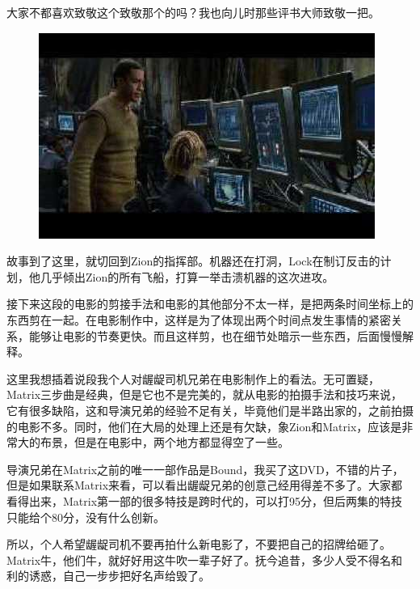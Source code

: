 \documentclass[UTF8]{ctexart}
\begin{document}
大家不都喜欢致敬这个致敬那个的吗？我也向儿时那些评书大师致敬一把。

\begin{figure}[htb]
\centering
\includegraphics[width=0.5\linewidth]{fig/read_reloaded-143}
\end{figure}

故事到了这里，就切回到Zion的指挥部。机器还在打洞，Lock在制订反击的计划，他几乎倾出Zion的所有飞船，打算一举击溃机器的这次进攻。

接下来这段的电影的剪接手法和电影的其他部分不太一样，是把两条时间坐标上的东西剪在一起。在电影制作中，这样是为了体现出两个时间点发生事情的紧密关系，能够让电影的节奏更快。而且这样剪，也在细节处暗示一些东西，后面慢慢解释。

这里我想插着说段我个人对龌龊司机兄弟在电影制作上的看法。无可置疑，Matrix三步曲是经典，但是它也不是完美的，就从电影的拍摄手法和技巧来说，它有很多缺陷，这和导演兄弟的经验不足有关，毕竟他们是半路出家的，之前拍摄的电影不多。同时，他们在大局的处理上还是有欠缺，象Zion和Matrix，应该是非常大的布景，但是在电影中，两个地方都显得空了一些。

导演兄弟在Matrix之前的唯一一部作品是Bound，我买了这DVD，不错的片子，但是如果联系Matrix来看，可以看出龌龊兄弟的创意己经用得差不多了。大家都看得出来，Matrix第一部的很多特技是跨时代的，可以打95分，但后两集的特技只能给个80分，没有什么创新。

所以，个人希望龌龊司机不要再拍什么新电影了，不要把自己的招牌给砸了。Matrix牛，他们牛，就好好用这牛吹一辈子好了。抚今追昔，多少人受不得名和利的诱惑，自己一步步把好名声给毁了。
\end{document}
